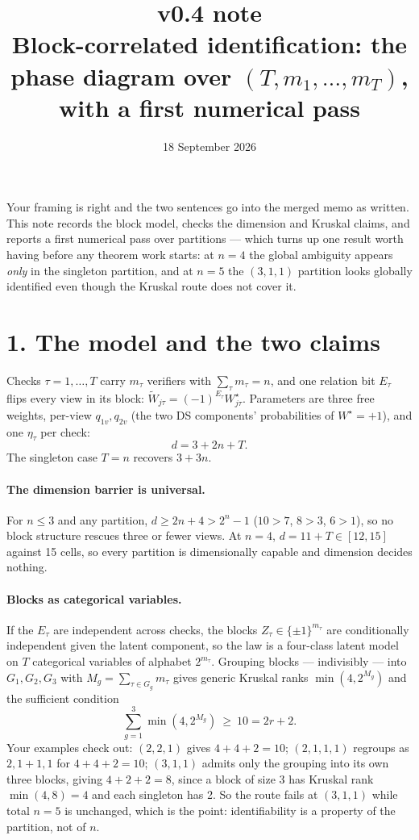 \documentclass[11pt]{article}
\title{\textbf{v0.4 note}\\[2pt]
\large Block-correlated identification: the phase diagram over $(T,m_1,\dots,m_T)$,\\ with a first numerical pass}
\author{18 September 2026}
\date{}
\theoremstyle{remark}
\newcommand{\Wt}{\widetilde{W}}
\begin{document}
\maketitle
\vspace{-2.5em}

Your framing is right and the two sentences go into the merged memo as written. This note records the block model, checks the dimension and Kruskal claims, and reports a first numerical pass over partitions --- which turns up one result worth having before any theorem work starts: at $n=4$ the global ambiguity appears \emph{only} in the singleton partition, and at $n=5$ the $(3,1,1)$ partition looks globally identified even though the Kruskal route does not cover it.

\section*{1. The model and the two claims}

Checks $\tau=1,\dots,T$ carry $m_\tau$ verifiers with $\sum_\tau m_\tau=n$, and one relation bit $E_\tau$ flips every view in its block: $\Wt_{j\tau}=(-1)^{E_\tau}W^\star_{j\tau}$. Parameters are three free weights, per-view $q_{1v},q_{2v}$ (the two DS components' probabilities of $W^\star=+1$), and one $\eta_\tau$ per check:
\[
d=3+2n+T .
\]
The singleton case $T=n$ recovers $3+3n$.

\paragraph{The dimension barrier is universal.} For $n\le3$ and any partition, $d\ge 2n+4>2^n-1$ ($10>7$, $8>3$, $6>1$), so no block structure rescues three or fewer views. At $n=4$, $d=11+T\in[12,15]$ against 15 cells, so every partition is dimensionally capable and dimension decides nothing.

\paragraph{Blocks as categorical variables.} If the $E_\tau$ are independent across checks, the blocks $Z_\tau\in\{\pm1\}^{m_\tau}$ are conditionally independent given the latent component, so the law is a four-class latent model on $T$ categorical variables of alphabet $2^{m_\tau}$. Grouping blocks --- indivisibly --- into $G_1,G_2,G_3$ with $M_g=\sum_{\tau\in G_g}m_\tau$ gives generic Kruskal ranks $\min(4,2^{M_g})$ and the sufficient condition
\[
\sum_{g=1}^{3}\min(4,2^{M_g})\ \ge\ 10 = 2r+2 .
\]
Your examples check out: $(2,2,1)$ gives $4+4+2=10$; $(2,1,1,1)$ regroups as $2,1{+}1,1$ for $4+4+2=10$; $(3,1,1)$ admits only the grouping into its own three blocks, giving $4+2+2=8$, since a block of size 3 has Kruskal rank $\min(4,8)=4$ and each singleton has 2. So the route fails at $(3,1,1)$ while total $n=5$ is unchanged, which is the point: identifiability is a property of the partition, not of $n$.
\end{document}

